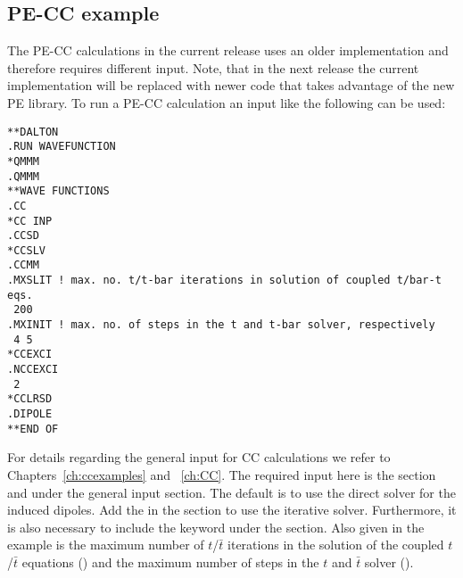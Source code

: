 \subsection{PE-CC example}\label{sec:pecc}
The PE-CC calculations in the current release uses an older implementation and 
therefore requires different input. Note, that in the next release the current 
implementation will be replaced with newer code that takes advantage of the
new PE library. To run a PE-CC calculation an input like the following can be
used:
\begin{verbatim}
**DALTON
.RUN WAVEFUNCTION
*QMMM
.QMMM
**WAVE FUNCTIONS
.CC
*CC INP
.CCSD
*CCSLV
.CCMM
.MXSLIT ! max. no. t/t-bar iterations in solution of coupled t/bar-t eqs.
 200
.MXINIT ! max. no. of steps in the t and t-bar solver, respectively
 4 5
*CCEXCI
.NCCEXCI
 2
*CCLRSD
.DIPOLE
**END OF
\end{verbatim}
For details regarding the general input for CC calculations we refer to 
Chapters~\ref{ch:ccexamples} and ~\ref{ch:CC}. The required input here is the 
 section and  under the general  input 
section. The default is to use the direct solver for the induced dipoles. Add 
the  in the  section to use the iterative solver. 
Furthermore, it is also necessary to include the  keyword under the 
 section. Also given in the example is the maximum number of 
$t$/$\bar{t}$ iterations in the solution of the coupled $t$/$\bar{t}$
equations () and the maximum number of steps in the $t$ and 
$\bar{t}$ solver ().

